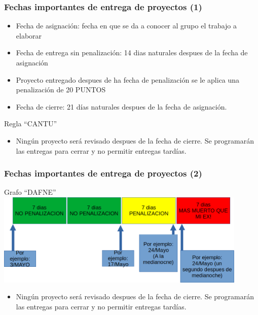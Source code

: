 
\begin{frame}
\frametitle{Fechas importantes de entrega de proyectos (1)}

\begin{itemize}
\item Fecha de asignación: fecha en que se da a conocer al grupo el trabajo a elaborar
\item Fecha de entrega sin penalización: 14 dias naturales despues de la fecha de asignación
\item Proyecto entregado despues de ha fecha de penalización se le aplica una penalización de 20 PUNTOS
\item Fecha de cierre: 21 días naturales despues de la fecha de asignación. 
\end{itemize}
\begin{block}{Regla ``CANTU''}
\begin{itemize}
\item Ningún proyecto será revisado despues de la fecha de cierre. Se programarán las entregas para cerrar y no permitir entregas tardías. 
\end{itemize}
\end{block}
\end{frame}

\begin{frame}
\frametitle{Fechas importantes de entrega de proyectos (2)}
\begin{block}{Grafo ``DAFNE''}
\includegraphics[width=12cm]{FechasEntrega/Grafo_Fechas.png}
\begin{itemize}
\item Ningún proyecto será revisado despues de la fecha de cierre. Se programarán las entregas para cerrar y no permitir entregas tardías. 
\end{itemize}
\end{block}

\end{frame}



